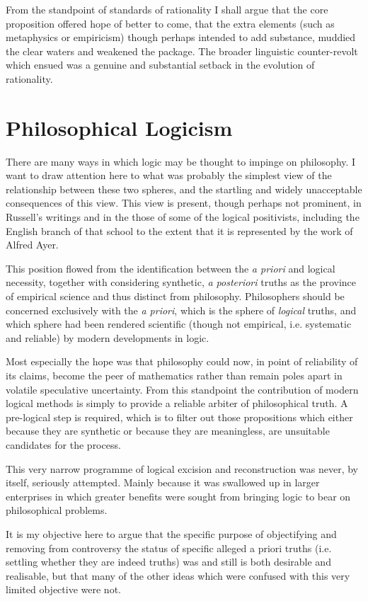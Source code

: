 From the standpoint of standards of rationality I shall argue that the core proposition offered hope of better to come, that the extra elements (such as metaphysics or empiricism) though perhaps intended to add substance, muddied the clear waters and weakened the package.
The broader linguistic counter-revolt which ensued was a genuine and substantial setback in the evolution of rationality.

\section{Philosophical Logicism}

There are many ways in which logic may be thought to impinge on philosophy.
I want to draw attention here to what was probably the simplest view of the relationship between these two spheres, and the startling and widely unacceptable consequences of this view.
This view is present, though perhaps not prominent, in Russell's writings and in the those of some of the logical positivists, including the English branch of that school to the extent that it is represented by the work of Alfred Ayer.

This position flowed from the identification between the {\it a priori} and logical necessity, together with considering synthetic, {\it a posteriori} truths as the province of empirical science and thus distinct from philosophy.
Philosophers should be concerned exclusively with the {\it a priori}, which is the sphere of {\it logical} truths, and which sphere had been rendered scientific (though not empirical, i.e. systematic and reliable) by modern developments in logic.

Most especially the hope was that philosophy could now, in point of reliability of its claims, become the peer of mathematics rather than remain poles apart in volatile speculative uncertainty.
From this standpoint the contribution of modern logical methods is simply to provide a reliable arbiter of philosophical truth.
A pre-logical step is required, which is to filter out those propositions which either because they are synthetic or because they are meaningless, are unsuitable candidates for the process.

This very narrow programme of logical excision and reconstruction was never, by itself, seriously attempted.
Mainly because it was swallowed up in larger enterprises in which greater benefits were sought from bringing logic to bear on philosophical problems.

It is my objective here to argue that the specific purpose of objectifying and removing from controversy the status of specific alleged a priori truths (i.e. settling whether they are indeed truths) was and still is both desirable and realisable, but that many of the other ideas which were confused with this very limited objective were not.

